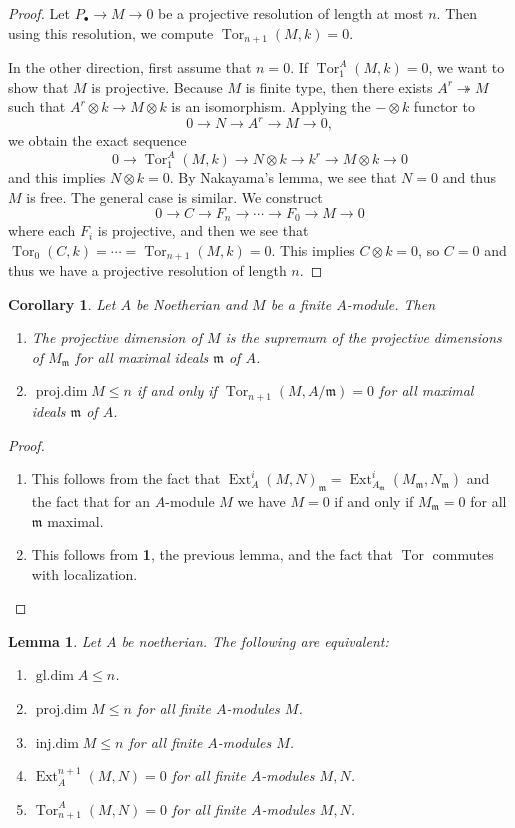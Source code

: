 \documentclass[leqno, openany]{memoir}
\newtheorem{cor}[thm]{Corollary}
\newtheorem{lem}[thm]{Lemma}
\theoremstyle{definition}
\theoremstyle{remark}
\theoremstyle{plain}
\theoremstyle{definition}
\theoremstyle{remark}
\newcommand{\mf}[1]{\mathfrak{#1}}
\DeclareMathOperator{\Ext}{Ext}
\DeclareMathOperator{\Tor}{Tor}
\DeclareMathOperator{\pdim}{proj.dim}
\DeclareMathOperator{\idim}{inj.dim}
\DeclareMathOperator{\gdim}{gl.dim}
\begin{document}
\begin{proof}
    Let $P_{\bullet} \to M \to 0$ be a projective resolution of length at most $n$. Then using this resolution, we compute $\Tor_{n+1}(M,k) = 0$. 

    In the other direction, first assume that $n=0$. If $\Tor_1^A(M,k) = 0$, we want to show that $M$ is projective. Because $M$ is finite type, then there exists $A^r \twoheadrightarrow M$ such that $A^r \otimes k \to M \otimes k$ is an isomorphism. Applying the $- \otimes k$ functor to
    \[ 0 \to N \to A^r \to M \to 0, \]
    we obtain the exact sequence
    \[ 0 \to \Tor_1^A(M,k) \to N \otimes k \to k^r \to M \otimes k \to 0 \]
    and this implies $N \otimes k = 0$. By Nakayama's lemma, we see that $N = 0$ and thus $M$ is free. The general case is similar. We construct
    \[ 0 \to C \to F_n \to \cdots \to F_0 \to M \to 0 \]
    where each $F_i$ is projective, and then we see that $\Tor_0(C,k) = \cdots = \Tor_{n+1}(M,k) = 0$. This implies $C \otimes k = 0$, so $C = 0$ and thus we have a projective resolution of length $n$.
\end{proof}

\begin{cor}
    Let $A$ be Noetherian and $M$ be a finite $A$-module. Then
    \begin{enumerate}
        \item The projective dimension of $M$ is the supremum of the projective dimensions of $M_{\mf{m}}$ for all maximal ideals $\mf{m}$ of $A$.
        \item $\pdim M \leq n$ if and only if $\Tor_{n+1}(M, A/\mf{m}) = 0$ for all maximal ideals $\mf{m}$ of $A$.
    \end{enumerate}
\end{cor}

\begin{proof}
    \begin{enumerate}
        \item This follows from the fact that $\Ext_A^i(M,N)_{\mf{m}} = \Ext_{A_{\mf{m}}}^i(M_{\mf{m}}, N_{\mf{m}})$ and the fact that for an $A$-module $M$ we have $M = 0$ if and only if $M_{\mf{m}} = 0$ for all $\mf{m}$ maximal.
        \item This follows from \textbf{1}, the previous lemma, and the fact that $\Tor$ commutes with localization. \qedhere 
    \end{enumerate}
\end{proof}

\begin{lem}
    Let $A$ be noetherian. The following are equivalent:
    \begin{enumerate}
        \item $\gdim A \leq n$.
        \item $\pdim M \leq n$ for all finite $A$-modules $M$.
        \item $\idim M \leq n$ for all finite $A$-modules $M$.
        \item $\Ext_A^{n+1}(M,N) = 0$ for all finite $A$-modules $M,N$.
        \item $\Tor_{n+1}^A(M, N) = 0$ for all finite $A$-modules $M,N$.
    \end{enumerate}
\end{lem}
\end{document}
